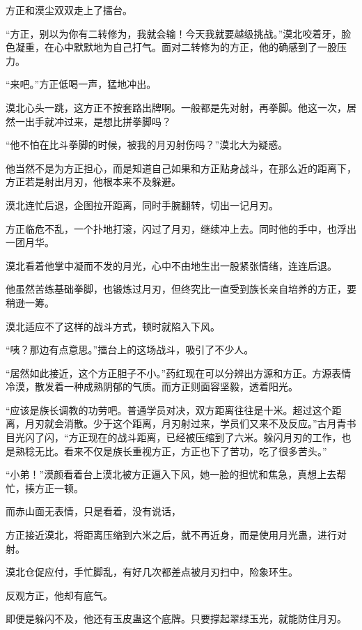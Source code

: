 
\begin{this_body}

方正和漠尘双双走上了擂台。

“方正，别以为你有二转修为，我就会输！今天我就要越级挑战。”漠北咬着牙，脸色凝重，在心中默默地为自己打气。面对二转修为的方正，他的确感到了一股压力。

“来吧。”方正低喝一声，猛地冲出。

漠北心头一跳，这方正不按套路出牌啊。一般都是先对射，再拳脚。他这一次，居然一出手就冲过来，是想比拼拳脚吗？

“他不怕在比斗拳脚的时候，被我的月刃射伤吗？”漠北大为疑惑。

他当然不是为方正担心，而是知道自己如果和方正贴身战斗，在那么近的距离下，方正若是射出月刃，他根本来不及躲避。

漠北连忙后退，企图拉开距离，同时手腕翻转，切出一记月刃。

方正临危不乱，一个扑地打滚，闪过了月刃，继续冲上去。同时他的手中，也浮出一团月华。

漠北看着他掌中凝而不发的月光，心中不由地生出一股紧张情绪，连连后退。

他虽然苦练基础拳脚，也锻炼过月刃，但终究比一直受到族长亲自培养的方正，要稍逊一筹。

漠北适应不了这样的战斗方式，顿时就陷入下风。

“咦？那边有点意思。”擂台上的这场战斗，吸引了不少人。

“居然如此接近，这个方正胆子不小。”药红现在可以分辨出方源和方正。方源表情冷漠，散发着一种成熟阴郁的气质。而方正则面容坚毅，透着阳光。

“应该是族长调教的功劳吧。普通学员对决，双方距离往往是十米。超过这个距离，月刃就会消散。少于这个距离，月刃射过来，学员们又来不及反应。”古月青书目光闪了闪，“方正现在的战斗距离，已经被压缩到了六米。躲闪月刃的工作，也是熟稔无比。看来不仅是族长重视方正，方正也下了苦功，吃了很多苦头。”

“小弟！”漠颜看着台上漠北被方正逼入下风，她一脸的担忧和焦急，真想上去帮忙，揍方正一顿。

而赤山面无表情，只是看着，没有说话，

方正接近漠北，将距离压缩到六米之后，就不再近身，而是使用月光蛊，进行对射。

漠北仓促应付，手忙脚乱，有好几次都差点被月刃扫中，险象环生。

反观方正，他却有底气。

即便是躲闪不及，他还有玉皮蛊这个底牌。只要撑起翠绿玉光，就能防住月刃。


\end{this_body}
